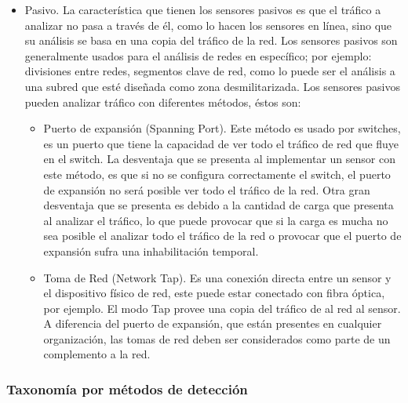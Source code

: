 \begin{itemize}
\begin{itemize}
		\item Pasivo. La característica que tienen los sensores pasivos es que el tráfico a analizar no pasa a través de él, como lo hacen los sensores en línea, sino que su análisis se basa en una copia del tráfico de la red. Los sensores pasivos son generalmente usados para el análisis de redes en específico; por ejemplo: divisiones entre redes, segmentos clave de red, como lo puede ser el análisis a una subred que esté diseñada como zona desmilitarizada. Los sensores pasivos pueden analizar tráfico con diferentes métodos, éstos son: \\
		\begin{itemize}
			\item Puerto de expansión (Spanning Port). Este método es usado por switches, es un puerto que tiene la capacidad de ver todo el tráfico de red que fluye en el switch. La desventaja que se presenta al implementar un sensor con este método, es que si no se configura correctamente el switch, el puerto de expansión no será posible ver todo el tráfico de la red. Otra gran desventaja que se presenta es debido a la cantidad de carga que presenta al analizar el tráfico, lo que puede provocar que si la carga es mucha no sea posible el analizar todo el tráfico de la red o provocar que el puerto de expansión sufra una inhabilitación temporal.\\
			
			\item Toma de Red (Network Tap). Es una conexión directa entre un sensor y el dispositivo físico de red, este puede estar conectado con fibra óptica, por ejemplo. El modo Tap provee una copia del tráfico de al red al sensor. A diferencia del puerto de expansión, que están presentes en cualquier organización, las tomas de red deben ser considerados como parte de un complemento a la red. \\
		\end{itemize}
	\end{itemize}
\end{itemize}


\subsubsection{Taxonomía por métodos de detección}

